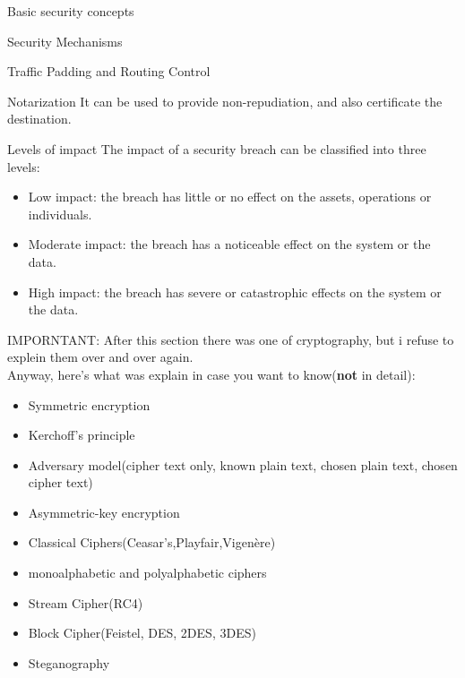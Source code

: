 \begin{section}{Basic security concepts}
\begin{subsection}{Security Mechanisms}
\begin{paragraph}{Traffic Padding and Routing Control}
  \end{paragraph}
  \begin{paragraph}{Notarization}
    It can be used to provide non-repudiation, and also certificate the destination.
  \end{paragraph}
\end{subsection}
\begin{subsection}{Levels of impact}
  The impact of a security breach can be classified into three levels:
  \begin{itemize}
    \item Low impact: the breach has little or no effect on the assets, operations or individuals.
    \item Moderate impact: the breach has a noticeable effect on the system or the data.
    \item High impact: the breach has severe or catastrophic effects on the system or the data.
  \end{itemize}
\end{subsection}
\begin{boxH}
  IMPORNTANT: After this section there was one of cryptography, but i refuse to explein them over and 
  over again.\\
  Anyway, here's what was explain in case you want to know(\textbf{not} in detail):
  \begin{itemize}
    \item Symmetric encryption
    \item Kerchoff's principle
    \item Adversary model(cipher text only, known plain text, chosen plain text, chosen cipher text)
    \item Asymmetric-key encryption
    \item Classical Ciphers(Ceasar's,Playfair,Vigenère)
    \item monoalphabetic and polyalphabetic ciphers
    \item Stream Cipher(RC4)
    \item Block Cipher(Feistel, DES, 2DES, 3DES)
    \item Steganography
  \end{itemize}
\end{boxH}
\end{section}
